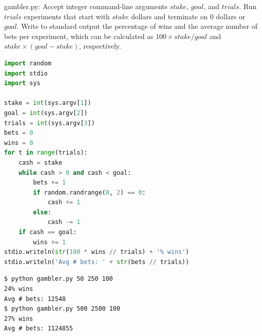 \documentclass[8pt,a4paper,compress]{beamer}
\begin{document}
\begin{frame}[fragile]
\pause

\begin{framed}
\tiny gambler.py: Accept integer command-line arguments $stake$, $goal$, and $trials$. Run $trials$ experiments that start with $stake$ dollars and terminate on 0 dollars or $goal$. Write to standard output the percentage of wins and the average number of bets per experiment, which can be calculated as $100 \times stake / goal$ and $stake \times (goal - stake)$, respectively.
\end{framed}

\begin{minipage}{200pt}
\begin{lstlisting}[language=Python]
import random
import stdio
import sys

stake = int(sys.argv[1])
goal = int(sys.argv[2])
trials = int(sys.argv[3])
bets = 0
wins = 0
for t in range(trials):
    cash = stake
    while cash > 0 and cash < goal:
        bets += 1
        if random.randrange(0, 2) == 0:
            cash += 1
        else:
            cash -= 1
    if cash == goal:
        wins += 1
stdio.writeln(str(100 * wins // trials) + '% wins')
stdio.writeln('Avg # bets: ' + str(bets // trials))
\end{lstlisting}
\end{minipage}%
\begin{minipage}{100pt}
\hfill {}
\end{minipage}

\pause

\begin{lstlisting}[language={}]
$ python gambler.py 50 250 100
24% wins
Avg # bets: 12548
$ python gambler.py 500 2500 100
27% wins
Avg # bets: 1124855
\end{lstlisting}
\end{frame}
\end{document}
